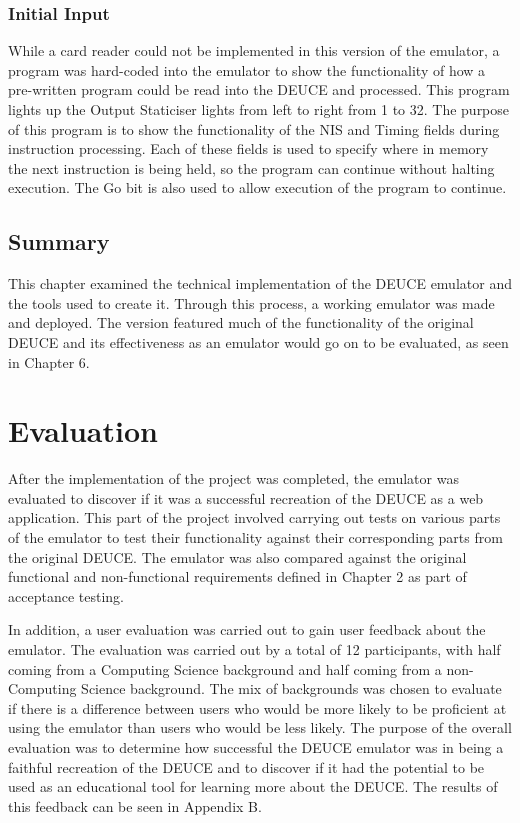 \documentclass{l4proj}
\begin{document}
\subsection{Initial Input}
While a card reader could not be implemented in this version of the emulator, a program was hard-coded into the emulator to show the functionality of how a pre-written program could be read into the DEUCE and processed. This program lights up the Output Staticiser lights from left to right from 1 to 32. The purpose of this program is to show the functionality of the NIS and Timing fields during instruction processing. Each of these fields is used to specify where in memory the next instruction is being held, so the program can continue without halting execution. The Go bit is also used to allow execution of the program to continue.

\section{Summary}
This chapter examined the technical implementation of the DEUCE emulator and the tools used to create it. Through this process, a working emulator was made and deployed. The version featured much of the functionality of the original DEUCE and its effectiveness as an emulator would go on to be evaluated, as seen in Chapter 6.

\chapter{Evaluation} 
After the implementation of the project was completed, the emulator was evaluated to discover if it was a successful recreation of the DEUCE as a web application. This part of the project involved carrying out tests on various parts of the emulator to test their functionality against their corresponding parts from the original DEUCE. The emulator was also compared against the original functional and non-functional requirements defined in Chapter 2 as part of acceptance testing.

In addition, a user evaluation was carried out to gain user feedback about the emulator. The evaluation was carried out by a total of 12 participants, with half coming from a Computing Science background and half coming from a non-Computing Science background. The mix of backgrounds was chosen to evaluate if there is a difference between users who would be more likely to be proficient at using the emulator than users who would be less likely. The purpose of the overall evaluation was to determine how successful the DEUCE emulator was in being a faithful recreation of the DEUCE and to discover if it had the potential to be used as an educational tool for learning more about the DEUCE. The results of this feedback can be seen in Appendix B.
\end{document}
